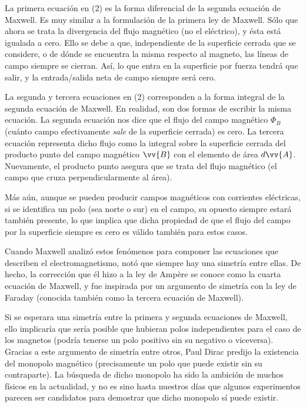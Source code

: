 \documentclass{article}
\begin{document}
La primera ecuación en (2) es la forma diferencial de la segunda ecuación de Maxwell. Es muy similar a la formulación de la primera ley de Maxwell. Sólo que ahora se trata la divergencia del flujo magnético (no el eléctrico), y ésta está igualada a cero. Ello se debe a que, independiente de la superficie cerrada que se considere, o de dónde se encuentra la misma respecto al magneto, las líneas de campo siempre se cierran. Así, lo que entra en la superficie por fuerza tendrá que salir, y la entrada/salida neta de campo siempre será cero.\bigskip

La segunda y tercera ecuaciones en (2) corresponden a la forma integral de la segunda ecuación de Maxwell. En realidad, son dos formas de escribir la misma ecuación. La segunda ecuación nos dice que el flujo del campo magnético $\Phi_B$ (cuánto campo efectivamente \emph{sale} de la superficie cerrada) es cero. La tercera ecuación representa dicho flujo como la integral sobre la superficie cerrada del producto punto del campo magnético $\vv{B}$ con el elemento de área $d\vv{A}$. Nuevamente, el producto punto asegura que se trata del flujo magnético (el campo que cruza perpendicularmente al área).\bigskip

Más aún, aunque se pueden producir campos magnéticos con corrientes eléctricas, si se identifica un polo (sea norte o sur) en el campo, su opuesto siempre estará también presente, lo que implica que dicha propiedad de que el flujo del campo por la superficie siempre es cero es válido también para estos casos.\bigskip

Cuando Maxwell analizó estos fenómenos para componer las ecuaciones que describen el electromagnetismo, notó que siempre hay una simetría entre ellas. De hecho, la corrección que él hizo a la ley de Ampère se conoce como la cuarta ecuación de Maxwell, y fue inspirada por un argumento de simetría con la ley de Faraday (conocida también como la tercera ecuación de Maxwell).\bigskip

Si se esperara una simetría entre la primera y segunda ecuaciones de Maxwell, ello implicaría que sería posible que hubieran polos independientes para el caso de los magnetos (podría tenerse un polo positivo sin su negativo o viceversa). Gracias a este argumento de simetría entre otros, Paul Dirac predijo la existencia del monopolo magnético (precisamente un polo que puede existir sin su contraparte). La búsqueda de dicho monopolo ha sido la ambición de muchos físicos en la actualidad, y no es sino hasta nuestros días que algunos experimentos parecen ser candidatos para demostrar que dicho monopolo sí puede existir.
\end{document}
